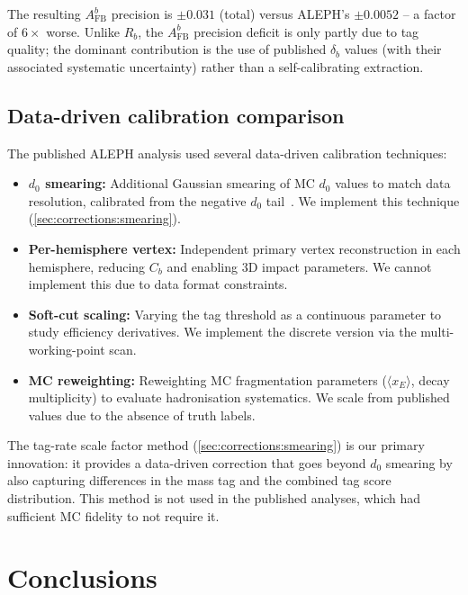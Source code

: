 \documentclass[11pt,a4paper]{article}
\begin{document}
The resulting $A_\text{FB}^b$ precision is
$\pm 0.031$ (total) versus ALEPH's $\pm 0.0052$ -- a factor
of $6\times$ worse.
Unlike $R_b$, the $A_\text{FB}^b$ precision deficit is only
partly due to tag quality; the dominant contribution is the
use of published $\delta_b$ values (with their associated
systematic uncertainty) rather than a self-calibrating extraction.

\subsection{Data-driven calibration comparison}
\label{sec:method:calibration}

The published ALEPH analysis used several data-driven calibration
techniques:
\begin{itemize}
\item \textbf{$d_0$ smearing:} Additional Gaussian smearing of MC
  $d_0$ values to match data resolution, calibrated from the
  negative $d_0$ tail~\cite{ALEPH:Rb:precise}.
  We implement this technique (\cref{sec:corrections:smearing}).
\item \textbf{Per-hemisphere vertex:} Independent primary vertex
  reconstruction in each hemisphere, reducing $C_b$ and enabling
  3D impact parameters.
  We cannot implement this due to data format constraints.
\item \textbf{Soft-cut scaling:} Varying the tag threshold as a
  continuous parameter to study efficiency derivatives.
  We implement the discrete version via the multi-working-point
  scan.
\item \textbf{MC reweighting:} Reweighting MC fragmentation
  parameters ($\langle x_E \rangle$, decay multiplicity) to
  evaluate hadronisation systematics.
  We scale from published values due to the absence of truth
  labels.
\end{itemize}

The tag-rate scale factor method (\cref{sec:corrections:smearing})
is our primary innovation: it provides a data-driven correction
that goes beyond $d_0$ smearing by also capturing differences in
the mass tag and the combined tag score distribution.
This method is not used in the published analyses, which had
sufficient MC fidelity to not require it.

\section{Conclusions}
\label{sec:conclusions}
\end{document}
